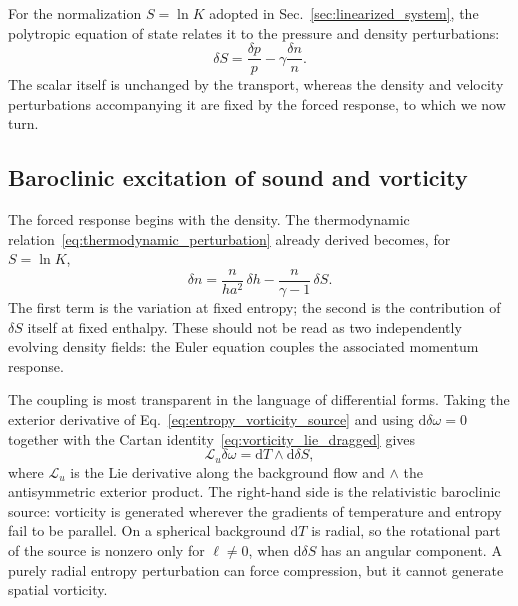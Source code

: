 \documentclass[12pt,a4paper,preprint,nopreprintline]{elsarticle}
\begin{document}
For the normalization $S=\ln K$ adopted in Sec.~\ref{sec:linearized_system}, the polytropic equation of state relates it to the pressure and density perturbations:
\begin{equation}
    \delta S
    =
    \frac{\delta p}{p}
    -
    \gamma\frac{\delta n}{n}.
    \label{eq:entropy_thermodynamic_definition}
\end{equation}
The scalar itself is unchanged by the transport, whereas the density and velocity perturbations accompanying it are fixed by the forced response, to which we now turn.

\subsection{Baroclinic excitation of sound and vorticity}
\label{sec:mode_coupling}

The forced response begins with the density. The thermodynamic relation~\eqref{eq:thermodynamic_perturbation} already derived becomes, for $S=\ln K$,
\begin{equation}
    \delta n
    =
    \frac{n}{ha^{2}}\,\delta h
    -
    \frac{n}{\gamma-1}\,\delta S.
    \label{eq:entropy_density_split}
\end{equation}
The first term is the variation at fixed entropy; the second is the contribution of $\delta S$ itself at fixed enthalpy. These should not be read as two independently evolving density fields: the Euler equation couples the associated momentum response.

The coupling is most transparent in the language of differential forms. Taking the exterior derivative of Eq.~\eqref{eq:entropy_vorticity_source} and using $\mathrm{d}\delta\omega=0$ together with the Cartan identity~\eqref{eq:vorticity_lie_dragged} gives
\begin{equation}
    \mathcal{L}_{u}\delta\omega
    =
    \mathrm{d}T\wedge\mathrm{d}\delta S,
    \label{eq:entropy_baroclinic_vorticity}
\end{equation}
where $\mathcal{L}_{u}$ is the Lie derivative along the background flow and $\wedge$ the antisymmetric exterior product. The right-hand side is the relativistic baroclinic source: vorticity is generated wherever the gradients of temperature and entropy fail to be parallel. On a spherical background $\mathrm{d}T$ is radial, so the rotational part of the source is nonzero only for $\ell\neq0$, when $\mathrm{d}\delta S$ has an angular component. A purely radial entropy perturbation can force compression, but it cannot generate spatial vorticity.
\end{document}
